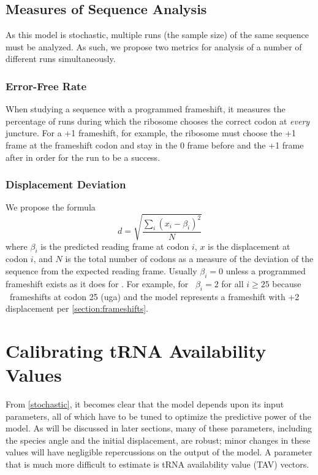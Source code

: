 \documentclass[12pt, draft]{article}
\numberwithin{equation}{section}
\begin{document}
\subsection{Measures of Sequence Analysis}

As this model is stochastic, multiple runs (the sample size) of the same sequence must be analyzed.
As such, we propose two metrics for analysis of a number of different runs 
simultaneously. 

\subsubsection{Error-Free Rate}

When studying a
sequence with a programmed frameshift, it measures the percentage of runs 
during which the ribosome chooses the correct codon
at \emph{every} juncture.  For a +1 frameshift, for example, the ribosome must
choose the +1 frame at the frameshift codon and stay in the 0 frame before
and the +1 frame after in order for the run to be a success.

\subsubsection{Displacement Deviation}
\label{section:deviation}

We propose the formula
\begin{equation}
    \label{eqn:lbd}
    d = \sqrt{\frac{\sum_i \left(x_i - \beta_i\right)^2}{N}}
\end{equation}
where $\beta_i$ is the predicted reading frame at codon $i$, $x$ is the displacement at codon $i$,
and $N$ is the total number of codons as a measure of the deviation of the sequence
from the expected reading frame.  Usually $\beta_i = 0$ unless a
programmed frameshift exists as it does for \prfB.
For example, for \prfB\ $\beta_i = 2$ for all $i \geq 25$ because \prfB\ frameshifts at codon 25 (uga)
and the model represents a frameshift with +2 displacement per \autoref{section:frameshifts}.

\section{Calibrating tRNA Availability Values}

From \autoref{stochastic}, it becomes clear that the model depends upon
its input parameters, all of which have to be tuned to optimize
the predictive power of the model.  As will be discussed in later sections,
many of these parameters, including the species angle and the initial displacement,
are robust; minor changes in these values will have negligible repercussions
on the output of the model.  A parameter that is much more difficult to estimate
is tRNA availability value (TAV) vectors.
\end{document}
